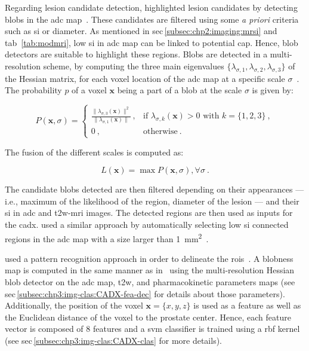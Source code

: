 Regarding lesion candidate detection, \citeauthor{Vos2012} highlighted lesion candidates by detecting blobs in the \ac{adc} map~\cite{Vos2012}.
These candidates are filtered using some \textit{a priori} criteria such as \ac{si} or diameter.
As mentioned in \acs{sec}\,\ref{subsec:chp2:imaging:mrsi} and \acs{tab}~\ref{tab:modmri}, low \ac{si} in \ac{adc} map can be linked to potential \ac{cap}.
Hence, blob detectors are suitable to highlight these regions. 
Blobs are detected in a multi-resolution scheme, by computing the three main eigenvalues $\{ \lambda_{\sigma,1},\lambda_{\sigma,2},\lambda_{\sigma,3} \}$ of the Hessian matrix, for each voxel location of the \ac{adc} map at a specific scale $\sigma$~\cite{Li2003}.
The probability $p$ of a voxel $\mathbf{x}$ being a part of a blob at the scale $\sigma$ is given by:

\begin{equation}
P(\mathbf{x},\sigma) = \begin{cases}
	\frac{\| \lambda_{\sigma,3}(\mathbf{x}) \|^{2}}{\| \lambda_{\sigma,1} (\mathbf{x}) \|} \ , & \text{if } \lambda_{\sigma,k}(\mathbf{x}) > 0 \text{ with } k = \{1,2,3\} \  , \\
	0 \ , & \text{otherwise} \ .
\end{cases}
\label{eq:blobdet}
\end{equation}

\noindent The fusion of the different scales is computed as:

\begin{equation}
	L(\mathbf{x}) = \max P(\mathbf{x},\sigma) , \forall \sigma \ .
	\label{eq:fusionBlob}
\end{equation}

The candidate blobs detected are then filtered depending on their appearances --- i.e., maximum of the likelihood of the region, diameter of the lesion --- and their \ac{si} in \ac{adc} and \ac{t2w}-\ac{mri} images.
The detected regions are then used as inputs for the \ac{cadx}.
\citeauthor{cameron2016maps} used a similar approach by automatically selecting low \ac{si} connected regions in the \ac{adc} map with a size larger than \SI{1}{\milli\metre\squared}~\cite{cameron2014multiparametric,cameron2016maps}.

\citeauthor{Litjens2011} used a pattern recognition approach in order to delineate the \acp{roi}~\cite{Litjens2011}.
A blobness map is computed in the same manner as in~\cite{Vos2010} using the multi-resolution Hessian blob detector on the \ac{adc} map, \ac{t2w}, and pharmacokinetic parameters maps (see \acs{sec}\,\ref{subsec:chp3:img-clas:CADX-fea-dec} for details about those parameters).
Additionally, the position of the voxel $\mathbf{x}=\{x,y,z\}$ is used as a feature as well as the Euclidean distance of the voxel to the prostate center.
Hence, each feature vector is composed of 8 features and a \ac{svm} classifier is trained using a \ac{rbf} kernel (see \acs{sec}\,\ref{subsec:chp3:img-clas:CADX-clas} for more details).

